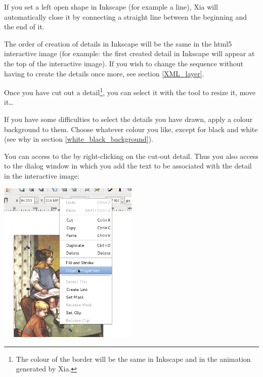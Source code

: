 \begin{alert}
  If you set a left open shape in Inkscape (for example a line), Xia will automatically close it  by connecting a straight line between the beginning and the end of it.
\end{alert}

\begin{alert}
 The order of creation of details in Inkscape will be 
 the same in the html5 interactive image (for example: the first created detail in
Inkscape will appear at the top of the interactive image).
If you wish to change the sequence without having to create the details once more, see 
section \ref{XML_layer}.
\end{alert}

Once you have cut out a detail\footnote{The colour of the border will be the same in Inkscape and 
in the animation generated by Xia.}, you can select it with the tool  
 to resize it, move it\ldots

\begin{tip}
If you have some difficulties to select the details you have drawn,
apply a colour background to them. Choose whatever colour you like, except for black and white
(see why in section \ref{white_black_background}).
\end{tip}


You can access to the  by right-clicking on the cut-out detail.
Thus you also access to the dialog window in which you add the text to be associated with the 
detail in the interactive image:\\

\begin{center}
 \includegraphics[width=0.5\textwidth]{./images/object_properties}\\ 
\end{center}

